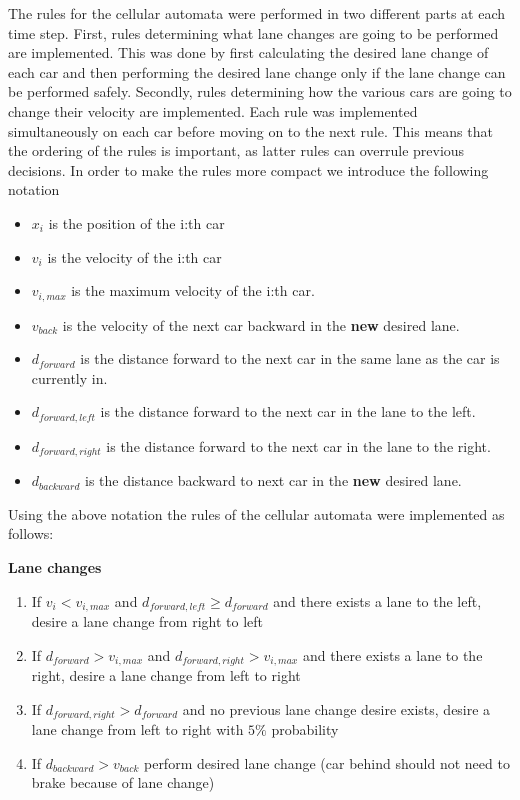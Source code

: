 \documentclass[a4paper,12pt]{article}
\begin{document}
The rules for the cellular automata were performed in two different parts at each time step.
First, rules determining what lane changes are going to be performed are implemented. This was done by first calculating the desired lane change of each car and then
performing the desired lane change only if the lane change can be performed safely.
Secondly, rules determining how the various cars are going to change their velocity are implemented.
Each rule was implemented simultaneously on each car before moving on to the next rule. This means that the ordering of the rules is important, as latter rules can overrule previous decisions.
In order to make the rules more compact we introduce the following notation

\begin{itemize}
    \item $x_i$ is the position of the i:th car
    \item $v_i$ is the velocity of the i:th car
    \item $v_{i, max}$ is the maximum velocity of the i:th car.
    \item $v_{back}$ is the velocity of the next car backward in the \textbf{new} desired lane.
    \item $d_{forward}$ is the distance forward to the next car in the same lane as the car is currently in.
    \item $d_{forward, left}$ is the distance forward to the next car in the lane to the left.
    \item $d_{forward, right}$ is the distance forward to the next car in the lane to the right.
    \item $d_{backward}$ is the distance backward to next car in the \textbf{new} desired lane.
\end{itemize}

Using the above notation the rules of the cellular automata were implemented as follows:

\vspace{5pt}
\textbf{Lane changes}
\begin{enumerate}
    \item If $v_i<v_{i,max}$ and $d_{forward, left}\geq d_{forward}$ and there exists a lane to the left, desire a lane change from right to left
    \item If $d_{forward} > v_{i, max}$ and $d_{forward, right} > v_{i, max}$ and there exists a lane to the right, desire a lane change from left to right
    \item If $d_{forward, right} > d_{forward}$ and no previous lane change desire exists, desire a lane change from left to right with $5\%$ probability
    \item If $d_{backward} > v_{back}$ perform desired lane change (car behind should not need to brake because of lane change)
\end{enumerate}
\end{document}
